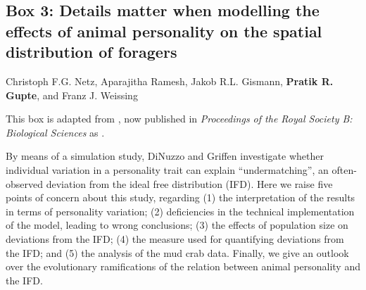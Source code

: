 
\begin{refsection}
\newrefcontext[sorting=ynt]
\pagestyle{plain}
\pagecolor{Snow2}

	\medskip
	\section*{Box 3: Details matter when modelling the
    effects of animal personality on the
    spatial distribution of foragers}\label{box:details}

	\medskip

	\noindent Christoph F.G. Netz, Aparajitha Ramesh, Jakob R.L. Gismann, \textbf{Pratik R. Gupte}, and Franz J. Weissing

	\medskip

	\noindent {\large{$\Delta$}} \small{This box is adapted from \citet{netz2022}, now published in \textit{Proceedings of the Royal Society B: Biological Sciences} as .}

	\medskip

	By means of a simulation study, DiNuzzo and Griffen \citep{dinuzzo2020} investigate whether individual variation in a personality trait can explain ``undermatching'', an often-observed deviation from the ideal free distribution (IFD). Here we raise five points of concern about this study, regarding (1) the interpretation of the results in terms of personality variation; (2) deficiencies in the technical implementation of the model, leading to wrong conclusions; (3) the effects of population size on deviations from the IFD; (4) the measure used for quantifying deviations from the IFD; and (5) the analysis of the mud crab data. Finally, we give an outlook over the evolutionary ramifications of the relation between animal personality and the IFD.
	

\end{refsection}
